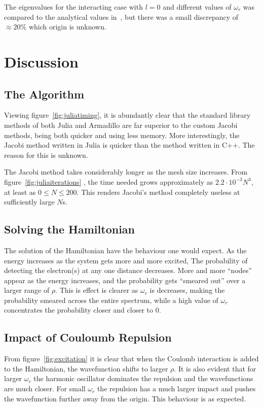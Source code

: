\documentclass[aps,reprint]{revtex4-1}
\begin{document}
The eigenvalues for the interacting case with \(l=0\) and different values of
\(\omega_{r}\) was compared to the analytical values in~\cite{taut}, but there
was a small discrepancy of \(\approx 20\%\) which origin is unknown.

\section{Discussion}

\subsection{The Algorithm}
Viewing figure~\ref{fig:juliatiming}, it is abundantly clear that the standard
library methods of both Julia and Armadillo are far superior to the custom
Jacobi methods, being both quicker and using less memory. More interestingly,
the Jacobi method written in Julia is quicker than the method written in C++.
The reason for this is unknown.

The Jacobi method takes considerably longer as the mesh size increases. From
figure~\ref{fig:juliaiterations} , the time needed grows approximately as
\(2.2\cdot 10^{-3}N^{3}\), at least as \(0\leq N \leq 200\). This renders
Jacobi's method completely useless at sufficiently large \(N\)s.

\subsection{Solving the Hamiltonian}
The solution of the Hamiltonian have the behaviour one would expect. As the
energy increases as the system gets more and more excited, The probability of
detecting the electron(s) at any one distance decreases. More and more ``nodes''
appear as the energy increases, and the probability gets ``smeared out'' over a
larger range of \(\rho\). This is effect is clearer as \(\omega_{r}\) is
decreases, making the probability smeared across the entire spectrum, while a
high value of \(\omega_{r}\) concentrates the probability closer and closer to \(0\).

\subsection{Impact of Couloumb Repulsion}
From figure~\ref{fig:excitation} it is clear that when the Coulomb interaction is added to the
Hamiltonian, the wavefunction shifts to larger $\rho$.
It is also evident that for larger $\omega_r$ the harmonic oscillator dominates the repulsion
and the wavefunctions are much closer. For small $\omega_r$ the repulsion
has a much larger impact and pushes the wavefunction further away from the origin.
This behaviour is as expected.
\label{sec:discussion}
\end{document}

